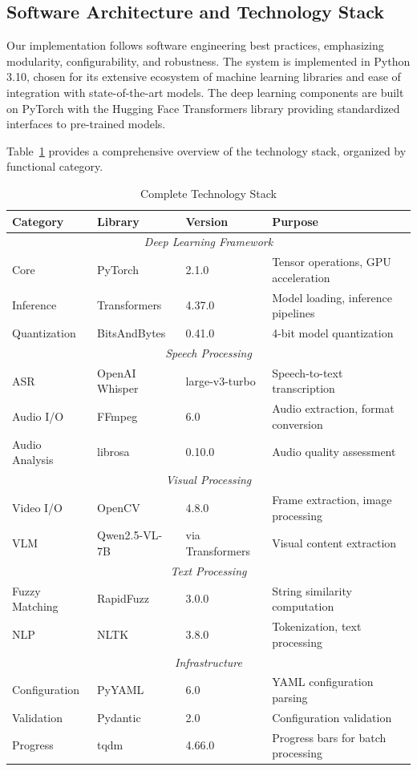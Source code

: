 \subsection{Software Architecture and Technology Stack}

Our implementation follows software engineering best practices, emphasizing modularity, configurability, and robustness. The system is implemented in Python 3.10, chosen for its extensive ecosystem of machine learning libraries and ease of integration with state-of-the-art models. The deep learning components are built on PyTorch \cite{Paszke2019} with the Hugging Face Transformers library \cite{Wolf2020} providing standardized interfaces to pre-trained models.

Table~\ref{tab:techstack_full} provides a comprehensive overview of the technology stack, organized by functional category.

\begin{table}[h]
\centering
\caption{Complete Technology Stack}
\label{tab:techstack_full}
\begin{tabular}{|l|l|l|p{4cm}|}
\hline
\textbf{Category} & \textbf{Library} & \textbf{Version} & \textbf{Purpose} \\
\hline
\multicolumn{4}{|c|}{\textit{Deep Learning Framework}} \\
\hline
Core & PyTorch & 2.1.0 & Tensor operations, GPU acceleration \\
\hline
Inference & Transformers & 4.37.0 & Model loading, inference pipelines \\
\hline
Quantization & BitsAndBytes & 0.41.0 & 4-bit model quantization \\
\hline
\multicolumn{4}{|c|}{\textit{Speech Processing}} \\
\hline
ASR & OpenAI Whisper & large-v3-turbo & Speech-to-text transcription \\
\hline
Audio I/O & FFmpeg & 6.0 & Audio extraction, format conversion \\
\hline
Audio Analysis & librosa & 0.10.0 & Audio quality assessment \\
\hline
\multicolumn{4}{|c|}{\textit{Visual Processing}} \\
\hline
Video I/O & OpenCV & 4.8.0 & Frame extraction, image processing \\
\hline
VLM & Qwen2.5-VL-7B & via Transformers & Visual content extraction \\
\hline
\multicolumn{4}{|c|}{\textit{Text Processing}} \\
\hline
Fuzzy Matching & RapidFuzz & 3.0.0 & String similarity computation \\
\hline
NLP & NLTK & 3.8.0 & Tokenization, text processing \\
\hline
\multicolumn{4}{|c|}{\textit{Infrastructure}} \\
\hline
Configuration & PyYAML & 6.0 & YAML configuration parsing \\
\hline
Validation & Pydantic & 2.0 & Configuration validation \\
\hline
Progress & tqdm & 4.66.0 & Progress bars for batch processing \\
\hline
\end{tabular}
\end{table}


